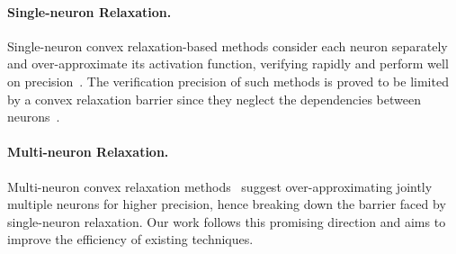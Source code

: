 \documentclass[runningheads]{llncs}
\newcommand{\prima}{\textsc{Prima}\xspace}
\newcommand{\krelu}{\textsc{kPoly}\xspace}
\begin{document}
\paragraph{Single-neuron Relaxation.}


Single-neuron
convex relaxation-based methods consider each neuron separately
and over-approximate its activation
function, verifying rapidly and perform well on precision~\cite{NEURIPS2018_f2f44698,DBLP:journals/pacmpl/SinghGPV19,DBLP:conf/nips/ZhangWCHD18,DBLP:conf/nips/SalmanY0HZ19,DBLP:conf/iclr/XuZ0WJLH21,Zheng2022}.
The
verification precision of such methods is proved to be limited by a
convex relaxation barrier since they neglect the dependencies between
neurons~\cite{DBLP:conf/nips/SalmanY0HZ19}.


\paragraph{Multi-neuron Relaxation.}
Multi-neuron convex relaxation
methods~\cite{DBLP:conf/nips/SinghGPV19,DBLP:conf/nips/TjandraatmadjaA20,DBLP:journals/pacmpl/MullerMSPV22}
suggest over-approximating jointly multiple neurons for higher
precision, hence breaking down the barrier faced by single-neuron
relaxation. Our work follows this promising direction and aims to
improve the efficiency of existing techniques.

%
%
%
\end{document}
